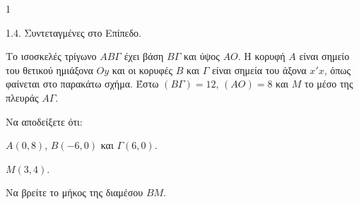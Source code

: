 \begin{ylh}{1}
    \item 1.4. Συντεταγμένες στο Επίπεδο.
\end{ylh}
\begin{figure}
    \centering
\end{figure}
Το ισοσκελές τρίγωνο $AB\Gamma$ έχει βάση $B\Gamma$ και ύψος $AO$. Η κορυφή $A$ είναι σημείο του θετικού ημιάξονα $Oy$ και οι κορυφές $B$ και $\Gamma$ είναι σημεία του άξονα $x'x$, όπως φαίνεται στο παρακάτω σχήμα. Έστω $(B\Gamma) = 12$, $(AO) = 8$ και $M$ το μέσο της πλευράς $A\Gamma$.

\begin{alist}
    \item Να αποδείξετε ότι:
    \begin{rlist}
        \item $A(0,8)$, $B(-6,0)$ και $\Gamma(6,0)$. 
        \item $M(3,4)$. 
    \end{rlist}
    \item Να βρείτε το μήκος της διαμέσου $BM$. 
\end{alist}